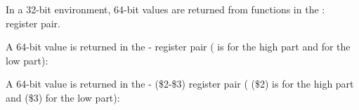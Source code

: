 ﻿




In a 32-bit environment, 64-bit values are returned from functions in the \EDX{}:\EAX{} register pair.




A 64-bit value is returned in the - register pair ( is for the high part and  for the low part):




A 64-bit value is returned in the - (\$2-\$3) register pair ( (\$2) is for the high part and  (\$3) for the low part):




